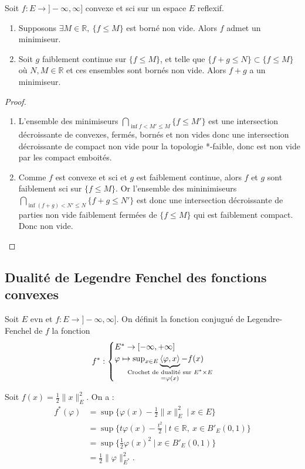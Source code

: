 \begin{propriete}
    Soit $f:E\to ]-\infty ,\infty ]$ convexe et sci sur un espace $E$ reflexif.
    \begin{enumerate}
        \item Supposons $\exists M\in \mathbb{R} ,\ \{f\le M\} $ est borné non vide. Alors $f$ admet un minimiseur.
        \item Soit $g$ faiblement continue sur $\{f\le M\} $, et telle que $\{f+g\le N\} \subset \{f\le M\} $ où $N,M\in \mathbb{R} $ et ces ensembles sont bornés non vide. Alors $f+g$ a un minimiseur.
    \end{enumerate}
\end{propriete}
\begin{proof}
    \begin{enumerate}\par\noindent
        \item L'ensemble des minimiseurs $\bigcap\limits_{\inf f<M'\le M} \{f\le M'\} $ est une intersection décroissante de convexes, fermés, bornés et non vides donc une intersection décroissante de compact non vide pour la topologie *-faible, donc est non vide par les compact emboités.
        \item Comme $f$ est convexe et sci et $g$ est faiblement continue, alors $f$ et $g$ sont faiblement sci sur $\{f\le M\} $. Or l'ensemble des mininimiseurs $\bigcap\limits_{\inf(f+g)<N'\le N}\{f+g\le N'\} $ est donc une intersection décroissante de parties non vide faiblement fermées de $\{f\le M\} $ qui est faiblement compact. Donc non vide.
    \end{enumerate}
\end{proof}

\subsection{Dualité de Legendre Fenchel des fonctions convexes}

\begin{definition}
    Soit $E$ evn et $f:E\to ]-\infty ,\infty ]$. On définit la fonction conjugué de Legendre-Fenchel de $f$ la fonction  $$f^* : \begin{cases}
        E^* \to [-\infty,+\infty]\\
        \varphi \mapsto \sup_{x\in E}\underbrace{\left<\varphi ,x \right>}_{\mathclap{\substack{\text{Crochet de dualité sur }E^*\times E\\=\varphi (x)}}}-f(x)
    \end{cases}$$
\end{definition}
\begin{ex}
    Soit $f(x)=\frac{1}{2}\|x\|^2_E.$ On a :
    \begin{align*}
        f^*(\varphi )&=\sup \{\varphi (x)-\frac{1}{2}\|x\|^2_E\ |\ x\in E\}\\
                     &=\sup \{t \varphi (x)-\frac{t^2}{2}\ |\ t\in \mathbb{R} ,\ x\in B'_E(0,1)\} \\
                     &=\sup \{\frac{1}{2}\varphi (x)^2\ |\ x\in B'_E(0,1)\} \\
                     &=\frac{1}{2}\|\varphi \|^2_{E^*}.
    \end{align*}
\end{ex}

